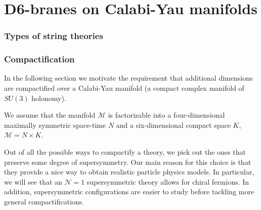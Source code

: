 \chapter{D6-branes on Calabi-Yau manifolds}

\subsection{Types of string theories}


\subsection{Compactification}

In the following section we motivate the requirement that additional dimensions are compactified
over a Calabi-Yau manifold (a compact complex manifold of $SU(3)$ holonomy).

We assume that the manifold $\mathcal M$ is factorizable into a four-dimensional maximally symmetric space-time $N$ and a six-dimensional compact space $K$,
$\mathcal M =  N\times K$.

Out of all the possible ways to compactify a theory, we pick out the ones that preserve some
degree of supersymmetry.
%
%
Our main reason for this choice is that they provide a nice way to obtain realistic particle 
physics models. 
In particular, we will see that an $\mathcal N=1$ supersymmetric theory allows for chiral fermions.
In addition, supersymmetric configurations are easier to study before tackling more general compactifications.

